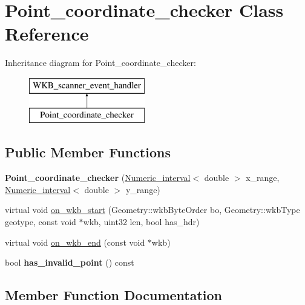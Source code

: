 \hypertarget{classPoint__coordinate__checker}{}\section{Point\+\_\+coordinate\+\_\+checker Class Reference}
\label{classPoint__coordinate__checker}
Inheritance diagram for Point\+\_\+coordinate\+\_\+checker\+:\begin{figure}[H]
\begin{center}
\leavevmode
\includegraphics[height=2.000000cm]{classPoint__coordinate__checker}
\end{center}
\end{figure}
\subsection*{Public Member Functions}
\begin{DoxyCompactItemize}
\item 
\mbox{\label{classPoint__coordinate__checker_a138d1f642b461297fe1aa1c211d8ae32}} 
{\bfseries Point\+\_\+coordinate\+\_\+checker} (\mbox{\hyperlink{classNumeric__interval}{Numeric\+\_\+interval}}$<$ double $>$ x\+\_\+range, \mbox{\hyperlink{classNumeric__interval}{Numeric\+\_\+interval}}$<$ double $>$ y\+\_\+range)
\item 
virtual void \mbox{\hyperlink{classPoint__coordinate__checker_a69fe70028bc0356ba1e10d47a7a76e8e}{on\+\_\+wkb\+\_\+start}} (Geometry\+::wkb\+Byte\+Order bo, Geometry\+::wkb\+Type geotype, const void $\ast$wkb, uint32 len, bool has\+\_\+hdr)
\item 
virtual void \mbox{\hyperlink{classPoint__coordinate__checker_a860f54df705a7452ee4f1c5ca825f0e6}{on\+\_\+wkb\+\_\+end}} (const void $\ast$wkb)
\item 
\mbox{\label{classPoint__coordinate__checker_ae2509e3fedfce55a1ff2a6e60d8d5660}} 
bool {\bfseries has\+\_\+invalid\+\_\+point} () const
\end{DoxyCompactItemize}


\subsection{Member Function Documentation}
\mbox{\label{classPoint__coordinate__checker_a860f54df705a7452ee4f1c5ca825f0e6}} 
